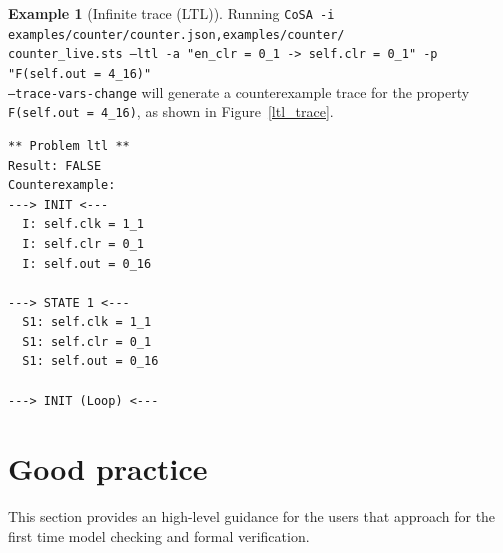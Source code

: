 \documentclass{article}
\theoremstyle{definition}
\newtheorem{example}{Example}[section]
\begin{document}
\begin{example}[Infinite trace (LTL)]
  Running \texttt{CoSA -i
    examples/counter/counter.json,examples/counter/\\counter\_live.sts
    --ltl -a "en\_clr = 0\_1 -> self.clr = 0\_1" -p "F(self.out =
    4\_16)" \\--trace-vars-change} will generate a counterexample trace
  for the property \texttt{F(self.out = 4\_16)}, as shown in
  Figure~\ref{ltl_trace}.

\begin{lstlisting}[frame=single,language=ets,caption=Simulation Counter\_4 (with changing values),label=ltl_trace]
** Problem ltl **
Result: FALSE
Counterexample:
---> INIT <---
  I: self.clk = 1_1
  I: self.clr = 0_1
  I: self.out = 0_16

---> STATE 1 <---
  S1: self.clk = 1_1
  S1: self.clr = 0_1
  S1: self.out = 0_16

---> INIT (Loop) <---
\end{lstlisting}

\end{example}


\section{Good practice}

This section provides an high-level guidance for the users that
approach for the first time model checking and formal verification.
\end{document}
